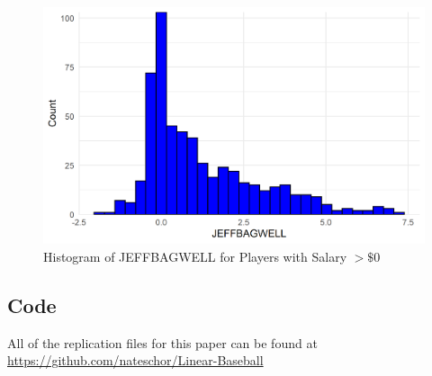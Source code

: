 \documentclass{article}
\begin{document}
\newpage
\begin{figure}[h]
\caption{Histogram of JEFFBAGWELL for Players with Salary $> \$0$}
\label{fig:bwar_hist}
\centering
\includegraphics[width=0.7\paperwidth, scale=1.25]{war_hist.png}
\end{figure}

\newpage

\subsection{Code}

All of the replication files for this paper can be found at \url{https://github.com/nateschor/Linear-Baseball}
\end{document}
